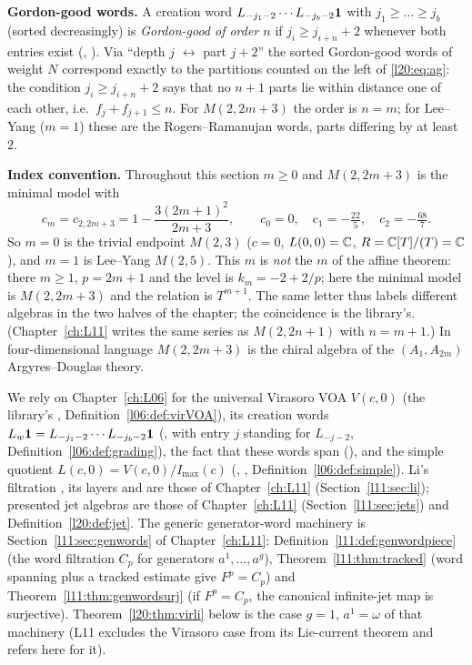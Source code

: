 \textbf{Gordon-good words.} A creation word $L_{-j_1-2}\cdots L_{-j_b-2}\mathbf{1}$ with $j_1\ge\dots\ge j_b$ (sorted
decreasingly) is \emph{Gordon-good of order $n$} if $j_i\ge j_{i+n}+2$ whenever both entries exist (,
). Via ``depth $j$ $\leftrightarrow$ part $j+2$'' the
sorted Gordon-good words of weight $N$ correspond exactly to the partitions counted on the left of \eqref{l20:eq:ag}: the
condition $j_i\ge j_{i+n}+2$ says that no $n+1$ parts lie within distance one of each other, i.e.\ $f_j+f_{j+1}\le n$. For
$M(2,2m+3)$ the order is $n=m$; for Lee--Yang ($m=1$) these are the Rogers--Ramanujan words, parts differing by at least $2$.

\textbf{Index convention.} Throughout this section $m\ge0$ and $M(2,2m+3)$ is the minimal model with
\begin{equation*}
c_m=c_{2,2m+3}=1-\frac{3(2m+1)^2}{2m+3},\qquad c_0=0,\quad c_1=-\tfrac{22}{5},\quad c_2=-\tfrac{68}{7}.
\end{equation*}
So $m=0$ is the trivial endpoint $M(2,3)$ ($c=0$, $L(0,0)={\mathbb{C}}$, $R={\mathbb{C}}[T]/(T)={\mathbb{C}}$), and $m=1$ is Lee--Yang
$M(2,5)$. This $m$ is \emph{not} the $m$ of the affine theorem: there $m\ge1$, $p=2m+1$ and the level is
$k_m=-2+2/p$; here the minimal model is $M(2,2m+3)$ and the relation is $T^{m+1}$. The same letter thus labels different
algebras in the two halves of the chapter; the coincidence is the library's. (Chapter~\ref{ch:L11} writes the same series as
$M(2,2n+1)$ with $n=m+1$.) In four-dimensional language $M(2,2m+3)$ is the chiral algebra of the $(A_1,A_{2m})$
Argyres--Douglas theory.

We rely on Chapter~\ref{ch:L06} for the universal Virasoro VOA $V(c,0)$ (the library's ,
Definition~\ref{l06:def:virVOA}), its creation words $L_w\mathbf{1}=L_{-j_1-2}\cdots L_{-j_b-2}\mathbf{1}$
(, with entry $j$ standing for $L_{-j-2}$, Definition~\ref{l06:def:grading}), the fact that these
words span (), and the simple quotient $L(c,0)=V(c,0)/I_{\max}(c)$ (,
, Definition~\ref{l06:def:simple}). Li's filtration , its layers and
 are those of Chapter~\ref{ch:L11} (Section~\ref{l11:sec:li}); presented jet algebras are
those of Chapter~\ref{ch:L11} (Section~\ref{l11:sec:jets}) and Definition~\ref{l20:def:jet}. The generic
generator-word machinery is Section~\ref{l11:sec:genwords} of Chapter~\ref{ch:L11}: Definition~\ref{l11:def:genwordpiece}
(the word filtration $C_p$ for generators $a^1,\dots,a^g$), Theorem~\ref{l11:thm:tracked} (word spanning plus a tracked
estimate give $F^p=C_p$) and Theorem~\ref{l11:thm:genwordsurj} (if $F^p=C_p$, the canonical infinite-jet map is surjective).
Theorem~\ref{l20:thm:virli} below is the case $g=1$, $a^1=\omega$ of that machinery (L11 excludes the Virasoro case from its
Lie-current theorem and refers here for it).

